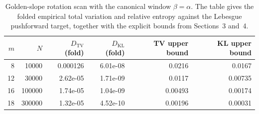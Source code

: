 \begin{table}[H]
\centering
\small
\begin{tabular}{rrrrrr}
\toprule
$m$ & $N$ & $D_{\mathrm{TV}}$ (fold) & $D_{\mathrm{KL}}$ (fold) & TV upper bound & KL upper bound\\
\midrule
8 & 10000 & 0.000126 & 6.01e-08 & 0.0216 & 0.0167\\
12 & 30000 & 2.62e-05 & 1.71e-09 & 0.0117 & 0.00735\\
16 & 100000 & 1.74e-05 & 1.04e-09 & 0.00493 & 0.00174\\
18 & 300000 & 1.32e-05 & 4.52e-10 & 0.00196 & 0.00031\\
\bottomrule
\end{tabular}
\caption{Golden-slope rotation scan with the canonical window \(\beta=\alpha\).
The table gives the folded empirical total variation and relative entropy
against the Lebesgue pushforward target, together with the explicit bounds from
Sections~3 and~4.}
\label{tab:rotation-folded-kl-certificate}
\end{table}
